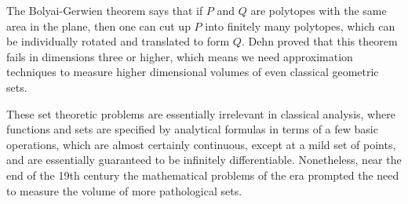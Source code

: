 \begin{remark}
  The Bolyai-Gerwien theorem says that if $P$ and $Q$ are polytopes with the same area in the plane, then one can cut up $P$ into finitely many polytopes, which can be individually rotated and translated to form $Q$. Dehn proved that this theorem fails in dimensions three or higher, which means we need approximation techniques to measure higher dimensional volumes of even classical geometric sets.
\end{remark}

These set theoretic problems are essentially irrelevant in classical analysis, where functions and sets are specified by analytical formulas in terms of a few basic operations, which are almost certainly continuous, except at a mild set of points, and are essentially guaranteed to be infinitely differentiable. Nonetheless, near the end of the 19th century the mathematical problems of the era prompted the need to measure the volume of more pathological sets.
%
